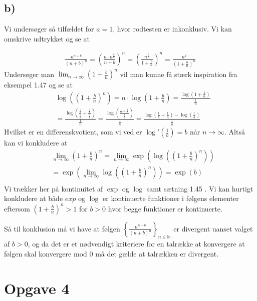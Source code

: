 \documentclass{article}
\newcommand{\m}[1]{\mathbb{#1}}
\newcommand{\mN}{\m{N}}
\newcommand{\lr}[1]{\left( #1\right)}
\newcommand{\lrc}[1]{\left\{ #1\right\}}
\begin{document}
\subsection*{b)}
Vi undersøger så tilfældet for $a = 1$, hvor rodtesten er inkonklusiv. Vi kan omskrive udtrykket og se at

\begin{align*}
\frac{n^{n+b}}{(n+b)^n} 
=\lr{\frac{n \cdot n^{\frac{b}{n}}}{n+b}}^n
=\lr{\frac{n^{\frac{b}{n}}}{1+\frac{b}{n}}}^n
=\frac{n^b}{\lr{1+\frac{b}{n}}^n}
\end{align*}
Undersøger man $\lim_{n \to \infty} (1+ \frac{b}{n})^n$ vil man kunne få stærk inspiration fra eksempel 1.47 \cite{an1}
og se at 
\begin{align*}
    &\log\lr{(1+ \frac{b}{n})^n}
    = n \cdot \log(1+ \frac{b}{n}) 
    = \frac{\log(1+ \frac{b}{n})}{\frac{1}{n}} \\
    &= \frac{\log\lr{\frac{\frac{1}{b}}{\frac{1}{b}} + \frac{\frac{1}{n}}{\frac{1}{b}}}}{\frac{1}{n}}
    = \frac{\log\lr{\frac{\frac{1}{b} + \frac{1}{n}}{\frac{1}{b}}}}{\frac{1}{n}}
    = \frac{\log\lr{\frac{1}{b} + \frac{1}{n}} - \log \lr{\frac{1}{b}}}{\frac{1}{n}}
\end{align*}
Hvilket er en differenskvotient, som vi ved er $\log'(\frac{1}{b}) = b$ når $n \to \infty$.
Altså kan vi konkludere at 
\begin{align*}
&\lim_{n \to \infty} (1+ \frac{b}{n})^n
=\lim_{n \to \infty} \exp \lr{\log \lr{(1+ \frac{b}{n})^n}}  \\
&=\exp \lr{\lim_{n \to \infty} \log \lr{(1+ \frac{b}{n})^n}} 
=\exp \lr{b}  \\
\end{align*}
Vi trækker her på kontinuitet af $\exp$ og $\log$ samt sætning 1.45 \cite{an1}. 
Vi kan hurtigt konkludere at både $exp$ og $\log$ er kontinuerte funktioner i følgens elementer
eftersom $(1+\frac{b}{n})^n > 1$ for $b>0$ hvor begge funktioner er kontinuerte.

Så til konklusion må vi have at følgen $\lrc{\frac{n^{n+b}}{(n+b)^n}}_{n \in \mN}$ er divergent uanset valget af $b> 0$,
og da det er et nødvendigt kriteriere for en talrække at konvergere at følgen skal konvergere mod $0$\cite[sætning 2.2]{an1} må
det gælde at talrækken er divergent.


\section*{Opgave 4}



\end{document}
